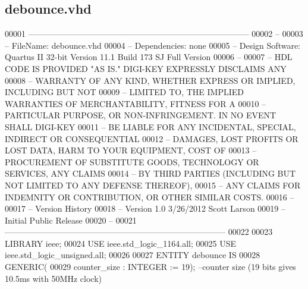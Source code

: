 \subsection{debounce.\+vhd}
\label{debounce_8vhd_source}

\begin{DoxyCode}
00001 \textcolor{keyword}{--------------------------------------------------------------------------------}
00002 \textcolor{keyword}{--}
00003 \textcolor{keyword}{--   FileName:         debounce.vhd}
00004 \textcolor{keyword}{--   Dependencies:     none}
00005 \textcolor{keyword}{--   Design Software:  Quartus II 32-bit Version 11.1 Build 173 SJ Full Version}
00006 \textcolor{keyword}{--}
00007 \textcolor{keyword}{--   HDL CODE IS PROVIDED "AS IS."  DIGI-KEY EXPRESSLY DISCLAIMS ANY}
00008 \textcolor{keyword}{--   WARRANTY OF ANY KIND, WHETHER EXPRESS OR IMPLIED, INCLUDING BUT NOT}
00009 \textcolor{keyword}{--   LIMITED TO, THE IMPLIED WARRANTIES OF MERCHANTABILITY, FITNESS FOR A}
00010 \textcolor{keyword}{--   PARTICULAR PURPOSE, OR NON-INFRINGEMENT. IN NO EVENT SHALL DIGI-KEY}
00011 \textcolor{keyword}{--   BE LIABLE FOR ANY INCIDENTAL, SPECIAL, INDIRECT OR CONSEQUENTIAL}
00012 \textcolor{keyword}{--   DAMAGES, LOST PROFITS OR LOST DATA, HARM TO YOUR EQUIPMENT, COST OF}
00013 \textcolor{keyword}{--   PROCUREMENT OF SUBSTITUTE GOODS, TECHNOLOGY OR SERVICES, ANY CLAIMS}
00014 \textcolor{keyword}{--   BY THIRD PARTIES (INCLUDING BUT NOT LIMITED TO ANY DEFENSE THEREOF),}
00015 \textcolor{keyword}{--   ANY CLAIMS FOR INDEMNITY OR CONTRIBUTION, OR OTHER SIMILAR COSTS.}
00016 \textcolor{keyword}{--}
00017 \textcolor{keyword}{--   Version History}
00018 \textcolor{keyword}{--   Version 1.0 3/26/2012 Scott Larson}
00019 \textcolor{keyword}{--     Initial Public Release}
00020 \textcolor{keyword}{--}
00021 \textcolor{keyword}{--------------------------------------------------------------------------------}
00022 
00023 \textcolor{vhdlkeyword}{LIBRARY }\textcolor{keywordflow}{ieee};
00024 \textcolor{vhdlkeyword}{USE }ieee.std\_logic\_1164.\textcolor{keywordflow}{all};
00025 \textcolor{vhdlkeyword}{USE }ieee.std\_logic\_unsigned.\textcolor{keywordflow}{all};
00026 
00027 \textcolor{keywordflow}{ENTITY }debounce \textcolor{keywordflow}{IS}
00028   \textcolor{keywordflow}{GENERIC}\textcolor{vhdlchar}{(}
00029     \textcolor{vhdlchar}{counter_size}  \textcolor{vhdlchar}{:}  \textcolor{comment}{INTEGER} \textcolor{vhdlchar}{:=} \textcolor{vhdllogic}{}\textcolor{vhdllogic}{19}\textcolor{vhdlchar}{)};\textcolor{keyword}{ --counter size (19 bits gives 10.5ms with 50MHz clock)}

\end{DoxyCode}

